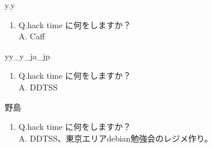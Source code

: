 \begin{prework}{ y.y }
  \begin{enumerate}
  \item Q.hack time に何をしますか？\\
    A. Caff
  \end{enumerate}
\end{prework}

\begin{prework}{ yy\_y\_ja\_jp }
  \begin{enumerate}
  \item Q.hack time に何をしますか？\\
    A. DDTSS
  \end{enumerate}
\end{prework}

\begin{prework}{ 野島 }
  \begin{enumerate}
  \item Q.hack time に何をしますか？\\
    A. DDTSS、東京エリアdebian勉強会のレジメ作り。
  \end{enumerate}
\end{prework}




